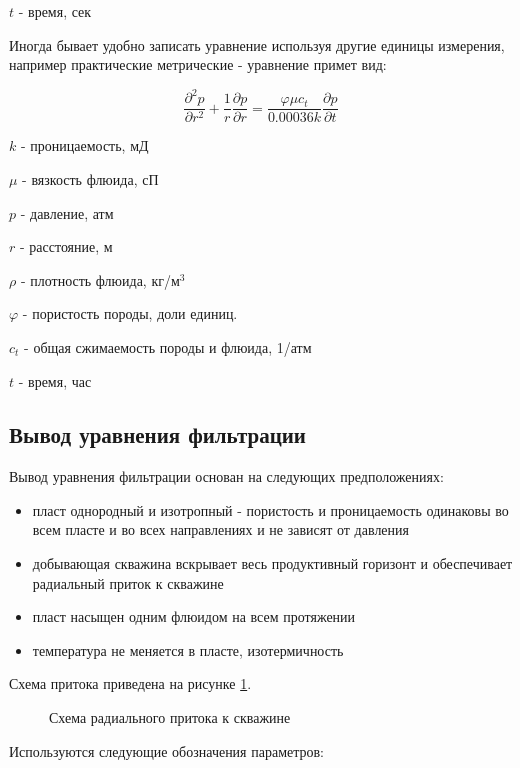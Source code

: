 $t$ - время, сек

Иногда бывает удобно записать уравнение используя другие единицы измерения, например практические метрические - уравнение примет вид:

\begin{equation} \label{eq:diff_eq_2} 
	\frac{\partial ^2 p }{\partial r^2} + \frac{1}{r} \frac{\partial p}{\partial r} = \frac{\varphi \mu c_t}{0.00036 k} \frac{\partial p}{\partial t} 
\end{equation}


$k$ - проницаемость, мД

$\mu$ - вязкость флюида, сП

$p$ - давление, атм 

$r$ - расстояние, м 

$\rho$ - плотность флюида, кг/м$^3$

$\varphi$ - пористость породы, доли единиц.

$c_t$ - общая сжимаемость породы и флюида, 1/атм

$t$ - время, час

\subsection{Вывод уравнения фильтрации}

Вывод уравнения фильтрации основан на следующих предположениях: 
\begin{itemize}
	\item пласт однородный и изотропный - пористость и проницаемость одинаковы во всем пласте и во всех направлениях и не зависят от давления 
	\item добывающая скважина вскрывает весь продуктивный горизонт и обеспечивает радиальный приток к скважине
	\item пласт насыщен одним флюидом на всем протяжении
	\item температура не меняется в пласте, изотермичность
\end{itemize}

Схема притока приведена на рисунке \ref{ris:radial_inflow_scheme}.

\begin{figure}[h!]
	\begin{center}
		
		\caption{Схема радиального притока к скважине}
		\label{ris:radial_inflow_scheme}
	\end{center}
\end{figure}

Используются следующие обозначения параметров:

